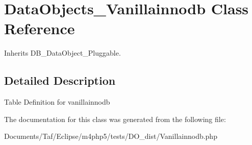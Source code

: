 \hypertarget{classDataObjects__Vanillainnodb}{
\section{DataObjects\_\-Vanillainnodb Class Reference}
\label{classDataObjects__Vanillainnodb}
}
Inherits DB\_\-DataObject\_\-Pluggable.



\subsection{Detailed Description}
Table Definition for vanillainnodb 

The documentation for this class was generated from the following file:\begin{CompactItemize}
\item 
Documents/Taf/Eclipse/m4php5/tests/DO\_\-dist/Vanillainnodb.php\end{CompactItemize}
